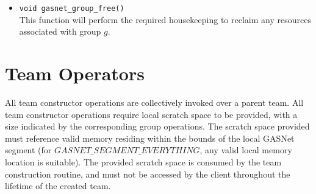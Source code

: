 \documentclass[times,10pt]{article}
\begin{document}
\begin{itemize}
\item \texttt{void gasnet\_group\_free(\grouparg)} \\ 
This function will perform the required housekeeping to reclaim any resources
associated with group $g$.  

\end{itemize}



\section{Team Operators}
All team constructor operations are collectively invoked over a parent team.
All team constructor operations require local scratch space to be provided,
with a size indicated by the corresponding group operations. The scratch space
provided must reference valid memory residing within the bounds of the local GASNet segment
(for $GASNET\_SEGMENT\_EVERYTHING$, any valid local memory location is suitable).
The provided scratch space is consumed by the team construction routine, 
and must not be accessed by the client throughout the lifetime of the created team.
\end{document}

